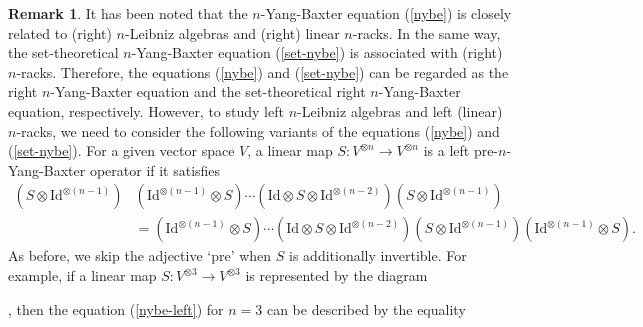 \documentclass[a4paper,reqno,10pt]{amsart}
\theoremstyle{plain}
\theoremstyle{definition}
\newtheorem{remark}[thm]{Remark}
\theoremstyle{remark}
\begin{document}
\begin{remark} It has been noted that the $n$-Yang-Baxter equation (\ref{nybe}) is closely related to (right) $n$-Leibniz algebras and (right) linear $n$-racks. In the same way, the set-theoretical $n$-Yang-Baxter equation (\ref{set-nybe}) is associated with (right) $n$-racks. Therefore, the equations (\ref{nybe}) and (\ref{set-nybe}) can be regarded as the right $n$-Yang-Baxter equation and the set-theoretical right $n$-Yang-Baxter equation, respectively. However, to study left $n$-Leibniz algebras and left (linear) $n$-racks, we need to consider the following variants of the equations (\ref{nybe}) and (\ref{set-nybe}). For a given vector space $V$, a linear map $S : V^{\otimes n} \rightarrow V^{\otimes n}$ is a left pre-$n$-Yang-Baxter operator if it satisfies
\begin{align}\label{nybe-left}
    (S \otimes \mathrm{Id}^{\otimes (n-1)}) & ( \mathrm{Id}^{\otimes (n-1)} \otimes S) \cdots (\mathrm{Id} \otimes S \otimes \mathrm{Id}^{\otimes (n-2)})  (S \otimes \mathrm{Id}^{\otimes (n-1)})  \\
     &= ( \mathrm{Id}^{\otimes (n-1)} \otimes S) \cdots  ( \mathrm{Id} \otimes S \otimes \mathrm{Id}^{\otimes (n-2)}) (S \otimes \mathrm{Id}^{\otimes (n-1)}) ( \mathrm{Id}^{\otimes (n-1)} \otimes S). \nonumber
\end{align}
As before, we skip the adjective `pre' when $S$ is additionally invertible. For example, if a linear map $S : V^{\otimes 3} \rightarrow V^{\otimes 3}$ is represented by the diagram ~~~ \!  \!
, then the equation (\ref{nybe-left}) for $n=3$ can be described by the equality

    \medskip


\end{remark}
\end{document}
